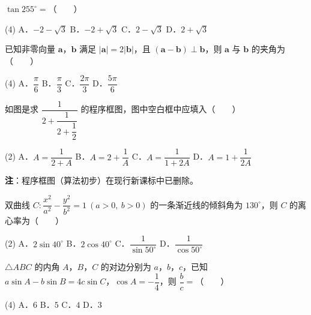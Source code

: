 \begin{question}
$\tan255^\circ=$\mbox{（　　）}

\begin{gkopts}(4)
\task A．$-2-\sqrt3$
\task B．$-2+\sqrt3$
\task C．$2-\sqrt3$
\task D．$2+\sqrt3$
\end{gkopts}

\end{question}
\begin{question}
已知非零向量 $\boldsymbol a$，$\boldsymbol b$ 满足 $|\boldsymbol a|=2|\boldsymbol b|$，且 $(\boldsymbol a-\boldsymbol b)\perp\boldsymbol b$，则 $\boldsymbol a$ 与 $\boldsymbol b$ 的夹角为\mbox{（　　）}

\begin{gkopts}(4)
\task A．$\dfrac\pi6$
\task B．$\dfrac\pi3$
\task C．$\dfrac{2\pi}3$
\task D．$\dfrac{5\pi}6$
\end{gkopts}

\Needspace{0.4\textheight}
\end{question}
\begin{question}
如图是求 $\dfrac1{2+\dfrac1{2+\dfrac12}}$ 的程序框图，图中空白框中应填入\mbox{（　　）}
\nopagebreak[4]
\begin{center}\end{center}
\nopagebreak[4]
\begin{gkopts}(2)
\task A．$A=\dfrac1{2+A}$
\task B．$A=2+\dfrac1A$
\task C．$A=\dfrac1{1+2A}$
\task D．$A=1+\dfrac1{2A}$
\end{gkopts}

\begin{gktip}
\textbf{注}：程序框图（算法初步）在现行新课标中已删除。
\end{gktip}

\end{question}
\begin{question}
双曲线 $C:\dfrac{x^{2}}{a^{2}}-\dfrac{y^{2}}{b^{2}}=1\ (a>0,\ b>0)$ 的一条渐近线的倾斜角为 $130^\circ$，则 $C$ 的离心率为\mbox{（　　）}

\begin{gkopts}(2)
\task A．$2\sin40^\circ$
\task B．$2\cos40^\circ$
\task C．$\dfrac1{\sin50^\circ}$
\task D．$\dfrac1{\cos50^\circ}$
\end{gkopts}

\end{question}
\begin{question}
$\triangle ABC$ 的内角 $A$，$B$，$C$ 的对边分别为 $a$，$b$，$c$，已知 $a\sin A-b\sin B=4c\sin C$，$\cos A=-\dfrac14$，则 $\dfrac bc=$\mbox{（　　）}

\begin{gkopts}(4)
\task A．$6$
\task B．$5$
\task C．$4$
\task D．$3$
\end{gkopts}

\end{question}

